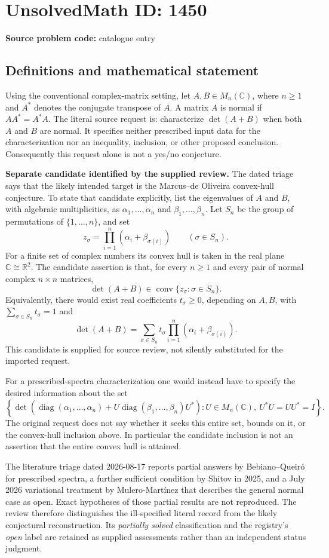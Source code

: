 \documentclass[11pt]{article}
\newcommand{\R}{\mathbb{R}}
\newcommand{\C}{\mathbb{C}}
\begin{document}
\section*{UnsolvedMath ID: 1450}
\textbf{Source problem code:} catalogue entry
\subsection{Definitions and mathematical statement}
Using the conventional complex-matrix setting, let $A,B\in M_n(\C)$, where $n\geq1$ and $A^*$ denotes the conjugate transpose of $A$. A matrix $A$ is normal if $AA^*=A^*A$. The literal source request is: characterize $\det(A+B)$ when both $A$ and $B$ are normal. It specifies neither prescribed input data for the characterization nor an inequality, inclusion, or other proposed conclusion. Consequently this request alone is not a yes/no conjecture.

\textbf{Separate candidate identified by the supplied review.} The dated triage says that the likely intended target is the Marcus--de Oliveira convex-hull conjecture. To state that candidate explicitly, list the eigenvalues of $A$ and $B$, with algebraic multiplicities, as $\alpha_1,\ldots,\alpha_n$ and $\beta_1,\ldots,\beta_n$. Let $S_n$ be the group of permutations of $\{1,\ldots,n\}$, and set
\[
 z_\sigma=\prod_{i=1}^{n}(\alpha_i+\beta_{\sigma(i)})\qquad(\sigma\in S_n).
\]
For a finite set of complex numbers its convex hull is taken in the real plane $\C\cong\R^2$. The candidate assertion is that, for every $n\geq1$ and every pair of normal complex $n\times n$ matrices,
\[
 \det(A+B)\in\operatorname{conv}\{z_\sigma:\sigma\in S_n\}.
\]
Equivalently, there would exist real coefficients $t_\sigma\geq0$, depending on $A,B$, with $\sum_{\sigma\in S_n}t_\sigma=1$ and
\[
 \det(A+B)=\sum_{\sigma\in S_n}t_\sigma
 \prod_{i=1}^{n}(\alpha_i+\beta_{\sigma(i)}).
\]
This candidate is supplied for source review, not silently substituted for the imported request.

For a prescribed-spectra characterization one would instead have to specify the desired information about the set
\[
 \left\{\det\!\left(\operatorname{diag}(\alpha_1,\ldots,\alpha_n)
 +U\operatorname{diag}(\beta_1,\ldots,\beta_n)U^*\right):
 U\in M_n(\C),\ U^*U=UU^*=I\right\}.
\]
The original request does not say whether it seeks this entire set, bounds on it, or the convex-hull inclusion above. In particular the candidate inclusion is not an assertion that the entire convex hull is attained.

The literature triage dated 2026-08-17 reports partial answers by Bebiano--Queiró for prescribed spectra, a further sufficient condition by Shitov in 2025, and a July 2026 variational treatment by Mulero-Martínez that describes the general normal case as open. Exact hypotheses of those partial results are not reproduced. The review therefore distinguishes the ill-specified literal record from the likely conjectural reconstruction. Its \emph{partially solved} classification and the registry's \emph{open} label are retained as supplied assessments rather than an independent status judgment.
\end{document}
